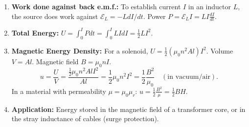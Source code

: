 \documentclass[11pt]{article}
\begin{document}
\begin{methode}
\begin{enumerate}
\item \textbf{Work done against back e.m.f.:} To establish current $I$ in an inductor $L$, the source does work against $\mathcal{E}_L = -L dI/dt$. Power $P = \mathcal{E}_L I = L I \frac{dI}{dt}$.
\item \textbf{Total Energy:} $U = \int_0^I P dt = \int_0^I L I dI = \frac{1}{2} L I^2$.
\item \textbf{Magnetic Energy Density:} For a solenoid, $U = \frac{1}{2} (\mu_0 n^2 A l) I^2$. Volume $V = Al$. Magnetic field $B = \mu_0 n I$.
\[
u = \frac{U}{V} = \frac{\frac{1}{2} \mu_0 n^2 A l I^2}{Al} = \frac{1}{2} \mu_0 n^2 I^2 = \frac{1}{2} \frac{B^2}{\mu_0} \quad (\text{in vacuum/air}).
\]
In a material with permeability $\mu = \mu_0 \mu_r$: $u = \frac{1}{2} \frac{B^2}{\mu} = \frac{1}{2} B H$.
\item \textbf{Application:} Energy stored in the magnetic field of a transformer core, or in the stray inductance of cables (surge protection).
\end{enumerate}
\end{methode}
\end{document}
